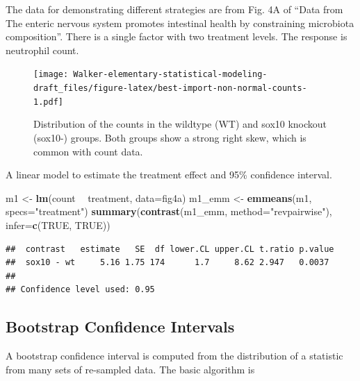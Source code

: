 \documentclass[]{book}
\newenvironment{Shaded}{\begin{snugshade}}{\end{snugshade}}
\newcommand{\DataTypeTok}[1]{\textcolor[rgb]{0.13,0.29,0.53}{#1}}
\newcommand{\KeywordTok}[1]{\textcolor[rgb]{0.13,0.29,0.53}{\textbf{#1}}}
\newcommand{\NormalTok}[1]{#1}
\newcommand{\OperatorTok}[1]{\textcolor[rgb]{0.81,0.36,0.00}{\textbf{#1}}}
\newcommand{\OtherTok}[1]{\textcolor[rgb]{0.56,0.35,0.01}{#1}}
\newcommand{\StringTok}[1]{\textcolor[rgb]{0.31,0.60,0.02}{#1}}
\begin{document}
The data for demonstrating different strategies are from Fig. 4A of ``Data from The enteric nervous system promotes intestinal health by constraining microbiota composition''. There is a single factor with two treatment levels. The response is neutrophil count.

\begin{figure}
\centering
\texttt{[image: Walker-elementary-statistical-modeling-draft\_files/figure-latex/best-import-non-normal-counts-1.pdf]}
\caption{\label{fig:best-import-non-normal-counts}Distribution of the counts in the wildtype (WT) and sox10 knockout (sox10-) groups. Both groups show a strong right skew, which is common with count data.}
\end{figure}

A linear model to estimate the treatment effect and 95\% confidence interval.

\begin{Shaded}
\begin{Highlighting}[]
\NormalTok{m1 <-}\StringTok{ }\KeywordTok{lm}\NormalTok{(count }\OperatorTok{~}\StringTok{ }\NormalTok{treatment, }\DataTypeTok{data=}\NormalTok{fig4a)}
\NormalTok{m1_emm <-}\StringTok{ }\KeywordTok{emmeans}\NormalTok{(m1, }\DataTypeTok{specs=}\StringTok{"treatment"}\NormalTok{)}
\KeywordTok{summary}\NormalTok{(}\KeywordTok{contrast}\NormalTok{(m1_emm, }\DataTypeTok{method=}\StringTok{"revpairwise"}\NormalTok{),}
        \DataTypeTok{infer=}\KeywordTok{c}\NormalTok{(}\OtherTok{TRUE}\NormalTok{, }\OtherTok{TRUE}\NormalTok{))}
\end{Highlighting}
\end{Shaded}

\begin{verbatim}
##  contrast   estimate   SE  df lower.CL upper.CL t.ratio p.value
##  sox10 - wt     5.16 1.75 174      1.7     8.62 2.947   0.0037 
## 
## Confidence level used: 0.95
\end{verbatim}

\hypertarget{bootstrap-confidence-intervals}{%
\subsection{Bootstrap Confidence Intervals}\label{bootstrap-confidence-intervals}}

A bootstrap confidence interval is computed from the distribution of a statistic from many sets of re-sampled data. The basic algorithm is
\end{document}
